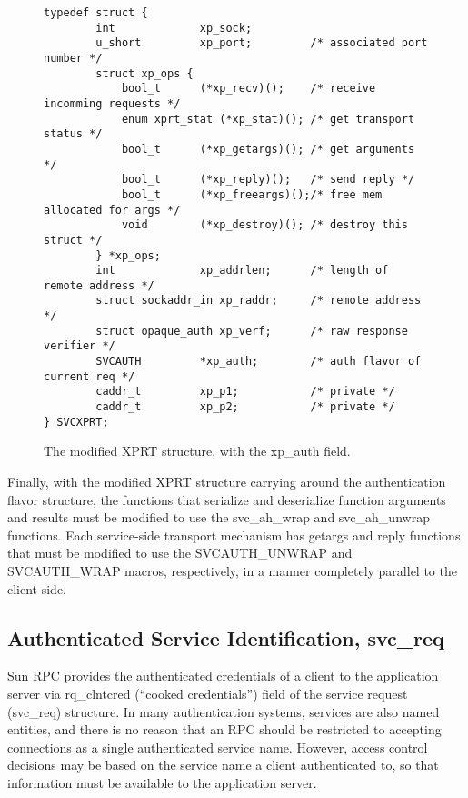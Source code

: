 \begin{figure}[htbp]
\begin{verbatim}
typedef struct {
        int             xp_sock;
        u_short         xp_port;         /* associated port number */
        struct xp_ops {
            bool_t      (*xp_recv)();    /* receive incomming requests */
            enum xprt_stat (*xp_stat)(); /* get transport status */
            bool_t      (*xp_getargs)(); /* get arguments */
            bool_t      (*xp_reply)();   /* send reply */
            bool_t      (*xp_freeargs)();/* free mem allocated for args */
            void        (*xp_destroy)(); /* destroy this struct */
        } *xp_ops;
        int             xp_addrlen;      /* length of remote address */
        struct sockaddr_in xp_raddr;     /* remote address */
        struct opaque_auth xp_verf;      /* raw response verifier */
        SVCAUTH         *xp_auth;        /* auth flavor of current req */
        caddr_t         xp_p1;           /* private */
        caddr_t         xp_p2;           /* private */
} SVCXPRT;
\end{verbatim}
\caption{The modified XPRT structure, with the xp_auth field.}
\label{fig:xprt}
\end{figure}

Finally, with the modified XPRT structure carrying around the
authentication flavor structure, the functions that serialize and
deserialize function arguments and results must be modified to use the
svc_ah_wrap and svc_ah_unwrap functions.  Each service-side transport
mechanism has getargs and reply functions that must be modified to use
the SVCAUTH_UNWRAP and SVCAUTH_WRAP macros, respectively, in a manner
completely parallel to the client side.

\subsection{Authenticated Service Identification, svc_req}

Sun RPC provides the authenticated credentials of a client to the
application server via rq_clntcred (``cooked credentials'') field of
the service request (svc_req) structure.  In many authentication
systems, services are also named entities, and there is no reason that
an RPC should be restricted to accepting connections as a single
authenticated service name.  However, access control decisions may be
based on the service name a client authenticated to, so that
information must be available to the application server.

